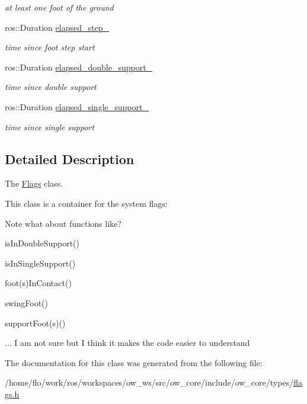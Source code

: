 \begin{DoxyCompactItemize}
\begin{DoxyCompactList}\small\item\em at least one foot of the ground \end{DoxyCompactList}\item 
ros\+::\+Duration \hyperlink{classow__core_1_1Flags_a57875546dbfc125ea8b3880772103055}{elapsed\+\_\+step\+\_\+}\hypertarget{classow__core_1_1Flags_a57875546dbfc125ea8b3880772103055}{}\label{classow__core_1_1Flags_a57875546dbfc125ea8b3880772103055}

\begin{DoxyCompactList}\small\item\em time since foot step start \end{DoxyCompactList}\item 
ros\+::\+Duration \hyperlink{classow__core_1_1Flags_a0b0d6698e22da8b554aac8e3f47ec058}{elapsed\+\_\+double\+\_\+support\+\_\+}\hypertarget{classow__core_1_1Flags_a0b0d6698e22da8b554aac8e3f47ec058}{}\label{classow__core_1_1Flags_a0b0d6698e22da8b554aac8e3f47ec058}

\begin{DoxyCompactList}\small\item\em time since double support \end{DoxyCompactList}\item 
ros\+::\+Duration \hyperlink{classow__core_1_1Flags_ae9e730ebddcdc8f6d33f202213049278}{elapsed\+\_\+single\+\_\+support\+\_\+}\hypertarget{classow__core_1_1Flags_ae9e730ebddcdc8f6d33f202213049278}{}\label{classow__core_1_1Flags_ae9e730ebddcdc8f6d33f202213049278}

\begin{DoxyCompactList}\small\item\em time since single support \end{DoxyCompactList}\end{DoxyCompactItemize}


\subsection{Detailed Description}
The \hyperlink{classow__core_1_1Flags}{Flags} class. 

This class is a container for the system flags\+:

\begin{DoxyNote}{Note}
what about functions like?
\begin{DoxyItemize}
\item is\+In\+Double\+Support()
\item is\+In\+Single\+Support()
\item foot(s)In\+Contact()
\item swing\+Foot()
\item support\+Foot(s)()
\item ... I am not sure but I think it makes the code easier to understand 
\end{DoxyItemize}
\end{DoxyNote}


The documentation for this class was generated from the following file\+:\begin{DoxyCompactItemize}
\item 
/home/flo/work/ros/workspaces/ow\+\_\+ws/src/ow\+\_\+core/include/ow\+\_\+core/types/\hyperlink{flags_8h}{flags.\+h}\end{DoxyCompactItemize}
